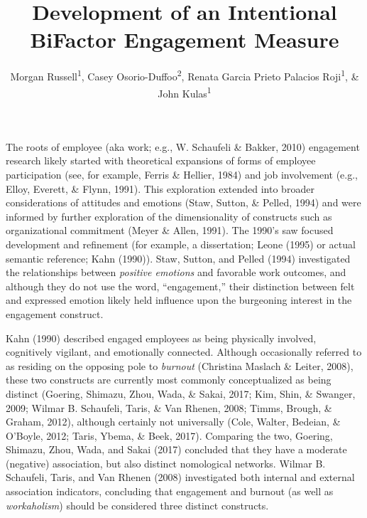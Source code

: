 \documentclass[
  english,
  man]{apa6}
\title{Development of an Intentional BiFactor Engagement Measure}
\author{Morgan Russell\textsuperscript{1}, Casey Osorio-Duffoo\textsuperscript{2}, Renata Garcia Prieto Palacios Roji\textsuperscript{1}, \& John Kulas\textsuperscript{1}}
\date{}
\affiliation{\vspace{0.5cm}\textsuperscript{1} Montclair State University\\\textsuperscript{2} Harver}
\begin{document}
\maketitle

The roots of employee (aka work; e.g., W. Schaufeli \& Bakker, 2010) engagement research likely started with theoretical expansions of forms of employee participation (see, for example, Ferris \& Hellier, 1984) and job involvement (e.g., Elloy, Everett, \& Flynn, 1991). This exploration extended into broader considerations of attitudes and emotions (Staw, Sutton, \& Pelled, 1994) and were informed by further exploration of the dimensionality of constructs such as organizational commitment (Meyer \& Allen, 1991). The 1990's saw focused development and refinement (for example, a dissertation; Leone (1995) or actual semantic reference; Kahn (1990)). Staw, Sutton, and Pelled (1994) investigated the relationships between \emph{positive emotions} and favorable work outcomes, and although they do not use the word, ``engagement,'' their distinction between felt and expressed emotion likely held influence upon the burgeoning interest in the engagement construct.

Kahn (1990) described engaged employees as being physically involved, cognitively vigilant, and emotionally connected. Although occasionally referred to as residing on the opposing pole to \emph{burnout} (Christina Maslach \& Leiter, 2008), these two constructs are currently most commonly conceptualized as being distinct (Goering, Shimazu, Zhou, Wada, \& Sakai, 2017; Kim, Shin, \& Swanger, 2009; Wilmar B. Schaufeli, Taris, \& Van Rhenen, 2008; Timms, Brough, \& Graham, 2012), although certainly not universally (Cole, Walter, Bedeian, \& O'Boyle, 2012; Taris, Ybema, \& Beek, 2017). Comparing the two, Goering, Shimazu, Zhou, Wada, and Sakai (2017) concluded that they have a moderate (negative) association, but also distinct nomological networks. Wilmar B. Schaufeli, Taris, and Van Rhenen (2008) investigated both internal and external association indicators, concluding that engagement and burnout (as well as \emph{workaholism}) should be considered three distinct constructs.
\end{document}
